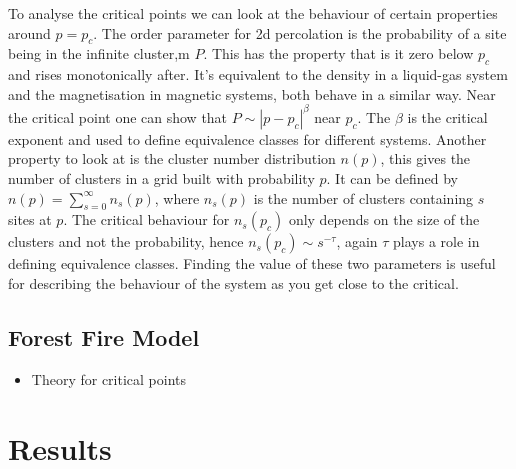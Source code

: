 \documentclass[%
 reprint,
 amsmath,amssymb,
 aps,
]{revtex4-2}
\begin{document}
To analyse the critical points we can look at the behaviour of certain properties around $p=p_{c}$. The order parameter for 2d percolation is the probability of a site being in the infinite cluster,m $P$. This has the property that is it zero below $p_{c}$ and rises monotonically after. It's equivalent to the density in a liquid-gas system and the magnetisation in magnetic systems, both behave in a similar way\cite{yeomans_statistical_1992}. Near the critical point one can show that $P \sim |p-p_{c}|^{\beta}$ near $p_{c}$. The $\beta$ is the critical exponent and used to define equivalence classes for different systems. Another property to look at is the cluster number distribution $n(p)$, this gives the number of clusters in a grid built with probability $p$. It can be defined by $n(p) = \sum_{s=0}^{\infty} n_{s}(p)$, where $n_{s}(p)$ is the number of clusters containing $s$ sites at $p$. The critical behaviour for $n_{s}(p_{c})$ only depends on the size of the clusters and not the probability, hence $n_{s}(p_{c}) \sim s^{-\tau}$\cite{stauffer_introduction_2003}, again $\tau$ plays a role in defining equivalence classes. Finding the value of these two parameters is useful for describing the behaviour of the system as you get close to the critical.

\subsection{Forest Fire Model}\label{sec:ff}
\begin{itemize}
\item Theory for critical points
\end{itemize}

\section{Results}
\end{document}
